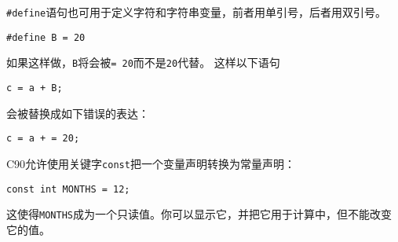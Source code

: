 \begin{frame}[fragile]
\lstinline|#define|语句也可用于定义字符和字符串变量，前者用单引号，后者用双引号。
\vspace{0.1in} \pause 

\begin{lstlisting}[title=常见错误]
#define B = 20
\end{lstlisting}
\vspace{0.1in}

如果这样做，\lstinline|B|将会被\lstinline|= 20|而不是\lstinline|20|代替。 这样以下语句
\begin{lstlisting}
c = a + B;
\end{lstlisting}
会被替换成如下错误的表达：
\begin{lstlisting}
c = a + = 20;
\end{lstlisting}
\end{frame}

\begin{frame}[fragile]
C90允许使用关键字\lstinline|const|把一个变量声明转换为常量声明：
\begin{lstlisting}
const int MONTHS = 12; 
\end{lstlisting}
这使得\lstinline|MONTHS|成为一个只读值。你可以显示它，并把它用于计算中，但不能改变它的值。
\end{frame}
